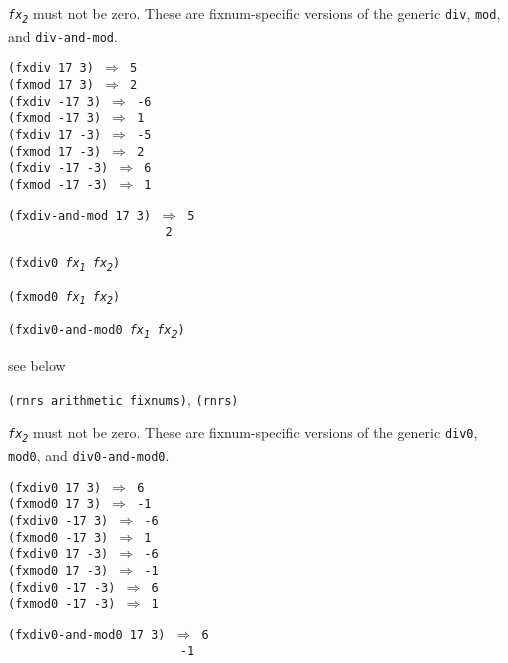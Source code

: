 \texttt{\textit{fx\textsubscript{2}}} must not be zero.
These are fixnum-specific versions of the generic \texttt{div},
\texttt{mod}, and \texttt{div-and-mod}.

\begin{alltt}
(fxdiv 17 3) \(\Rightarrow\) 5
(fxmod 17 3) \(\Rightarrow\) 2
(fxdiv -17 3) \(\Rightarrow\) -6
(fxmod -17 3) \(\Rightarrow\) 1
(fxdiv 17 -3) \(\Rightarrow\) -5
(fxmod 17 -3) \(\Rightarrow\) 2
(fxdiv -17 -3) \(\Rightarrow\) 6
(fxmod -17 -3) \(\Rightarrow\) 1

(fxdiv-and-mod 17 3) \(\Rightarrow\) 5
                      2
\end{alltt}

\begin{description}

\label{objects_s161}\item[procedure] \texttt{(fxdiv0 \textit{fx\textsubscript{1}} \textit{fx\textsubscript{2}})}



\item[procedure] \texttt{(fxmod0 \textit{fx\textsubscript{1}} \textit{fx\textsubscript{2}})}



\item[procedure] \texttt{(fxdiv0-and-mod0 \textit{fx\textsubscript{1}} \textit{fx\textsubscript{2}})}



\item[returns] see below


\item[libraries] \texttt{(rnrs arithmetic fixnums)}, \texttt{(rnrs)}
\end{description}

\texttt{\textit{fx\textsubscript{2}}} must not be zero.
These are fixnum-specific versions of the generic \texttt{div0},
\texttt{mod0}, and \texttt{div0-and-mod0}.

\begin{alltt}
(fxdiv0 17 3) \(\Rightarrow\) 6
(fxmod0 17 3) \(\Rightarrow\) -1
(fxdiv0 -17 3) \(\Rightarrow\) -6
(fxmod0 -17 3) \(\Rightarrow\) 1
(fxdiv0 17 -3) \(\Rightarrow\) -6
(fxmod0 17 -3) \(\Rightarrow\) -1
(fxdiv0 -17 -3) \(\Rightarrow\) 6
(fxmod0 -17 -3) \(\Rightarrow\) 1

(fxdiv0-and-mod0 17 3) \(\Rightarrow\) 6
                        -1
\end{alltt}

